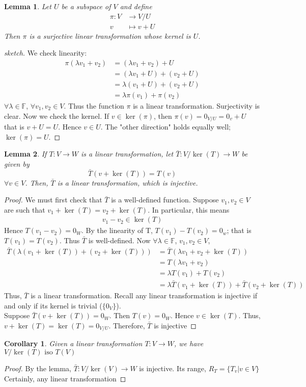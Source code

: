 \documentclass[a4paper, 11pt]{article}
\newtheorem*{corollary}{Corollary}
\newtheorem*{lemma}{Lemma}
\newcommand{\F}{\mathbb{F}}
\begin{document}
	
	\begin{lemma}
		Let $U$ be a subspace of $V$ and define 
			\begin{align*}
				\pi:V&\to V/U \\ 
				v &\mapsto v+U
			\end{align*}
		Then $\pi$ is a surjective linear transformation whose kernel is $U$. 
	\end{lemma} 
	\begin{proof}[sketch]
		We check linearity:
		\begin{align*}
			\pi(\lambda v_1+v_2) &= (\lambda v_1 + v_2)+ U \\ 
				&= (\lambda v_1 + U) + (v_2 + U) \\ 
				&= \lambda(v_1+U)+(v_2+U) \\ 
				&= \lambda\pi(v_1)+\pi(v_2) 
		\end{align*}
		$\forall \lambda \in \F$, $\forall v_1, v_2 \in V$. Thus the function $\pi$ is a linear transformation. Surjectivity is clear. Now we check the kernel. If $v\in \ker(\pi)$, then $\pi(v) = 0_{V/U} = 0_v+U$ that is $v+U = U$. Hence $v \in U$. The "other direction" holds equally well; $\ker(\pi) = U$. 
	\end{proof}

	\begin{lemma}
		If $T:V\to W$ is a linear transformation, let $\bar{T}:V/\ker(T)\to W$ be given by
			\begin{equation*}
				\bar{T}(v+\ker(T)) = T(v)
			\end{equation*}
		$\forall v \in V$. Then, $\bar{T}$ is a linear transformation, which is injective. 
	\end{lemma}
	\begin{proof}
		We must first check that $\bar{T}$ is a well-defined function. Suppose $v_1, v_2\in V$ are such that $v_1 + \ker(T) = v_2 + \ker(T)$. In particular, this means 
			\begin{align*}
				v_1 - v_2 \in \ker(T)
			\end{align*} 
		Hence $T(v_1 - v_2) = 0_W$. By the linearity of T, $T(v_1)-T(v_2) = 0_w$; that is $T(v_1)=T(v_2)$. Thus $\bar{T}$ is well-defined. Now $\forall \lambda \in \F$, $v_1, v_2 \in V$, 
			\begin{align*}
				\bar{T}(\lambda (v_1+ \ker(T)) + (v_2+\ker(T))) &= \bar{T}(\lambda v_1 + v_2+\ker(T)) \\ 
				&= T(\lambda v_1 + v_2) \\ 
				&= \lambda T(v_1) + T(v_2) \\ 
				&= \lambda\bar{T}(v_1+\ker(T)) + \bar{T}(v_2+\ker(T))
			\end{align*}
		Thus, $\bar{T}$ is a linear transformation. Recall any linear transformation is injective if and only if its kernel is trivial ($\{0_V\}$). \\ 
		
		\noindent Suppose $\bar{T}(v + \ker(T)) = 0_W$. Then $T(v) = 0_W$. Hence $v\in\ker(T)$. Thus, $v+\ker(T) = \ker(T) = 0_{V/U}$. Therefore, $\bar{T}$ is injective
	\end{proof}
	
	
	\begin{corollary}
		Given a linear transformation $T:V\to W$, we have $V/\ker(T) \text{ iso } T(V)$
	\end{corollary} 
	\begin{proof}
		By the lemma, $\bar{T}:V/\ker(V)\to W$ is injective. Its range, $R_T = \{ T_v | v\in V\}$ Certainly, any linear transformation 
	\end{proof}
\end{document}
